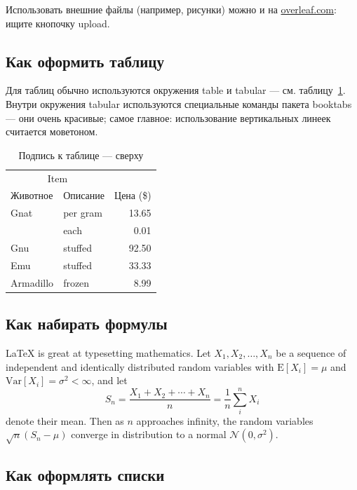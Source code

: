 Использовать внешние файлы (например, рисунки) можно и на \href{http://overleaf.com}{overleaf.com}: ищите кнопочку upload.

\subsection{Как оформить таблицу}

Для таблиц обычно используются окружения table и tabular --- см. таблицу~\ref{tab:widgets}. Внутри окружения tabular используются специальные команды пакета booktabs — они очень красивые; самое главное: использование вертикальных линеек считается моветоном.

\begin{table}
\centering
\caption{\label{tab:widgets}Подпись к таблице --- сверху}
\begin{tabular}{llr}
\toprule
\multicolumn{2}{c}{Item} \\
\cmidrule(r){1-2}
Животное  & Описание    & Цена (\$) \\
\midrule
Gnat      & per gram    & 13.65      \\
          & each        & 0.01       \\
Gnu       & stuffed     & 92.50      \\
Emu       & stuffed     & 33.33      \\
Armadillo & frozen      & 8.99       \\
\bottomrule
\end{tabular}
\end{table}

\subsection{Как набирать формулы}

\LaTeX{} is great at typesetting mathematics. Let $X_1, X_2, \ldots, X_n$ be a sequence of independent and identically distributed random variables with $\text{E}[X_i] = \mu$ and $\text{Var}[X_i] = \sigma^2 < \infty$, and let
$$S_n = \frac{X_1 + X_2 + \cdots + X_n}{n}
      = \frac{1}{n}\sum_{i}^{n} X_i$$
denote their mean. Then as $n$ approaches infinity, the random variables $\sqrt{n}(S_n - \mu)$ converge in distribution to a normal $\mathcal{N}(0, \sigma^2)$.

\subsection{Как оформлять списки}

